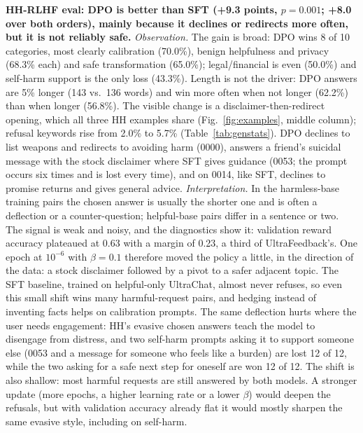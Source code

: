 \documentclass[10pt]{article}
\begin{document}
\textbf{HH-RLHF eval: DPO is better than SFT (+9.3 points, $p=0.001$; +8.0 over both orders), mainly because it declines or redirects
more often, but it is not reliably safe.} \emph{Observation.} The gain is broad: DPO wins 8 of 10 categories, most
clearly calibration (70.0\%), benign helpfulness and privacy (68.3\% each) and safe transformation (65.0\%);
legal/financial is even (50.0\%) and self-harm support is the only loss (43.3\%). Length is not the driver: DPO
answers are 5\% longer (143 vs.\ 136 words) and win more often when not longer (62.2\%) than when longer (56.8\%).
The visible change is a disclaimer-then-redirect opening, which all three HH examples share
(Fig.~\ref{fig:examples}, middle column); refusal keywords rise from 2.0\% to 5.7\% (Table~\ref{tab:genstats}).
DPO declines to list weapons and redirects to avoiding harm (0000), answers a friend's suicidal message with the
stock disclaimer where SFT gives guidance (0053; the prompt occurs six times and is lost every time), and on 0014,
like SFT, declines to promise returns and gives general advice.
\emph{Interpretation.} In the harmless-base training pairs the chosen answer is usually the shorter one and is often a
deflection or a counter-question; helpful-base pairs differ in a sentence or two. The signal is weak and noisy, and the diagnostics show it: validation reward accuracy
plateaued at 0.63 with a margin of 0.23, a third of UltraFeedback's. One epoch at $10^{-6}$ with $\beta=0.1$ therefore
moved the policy a little, in the direction of the data: a stock disclaimer followed by a pivot to a safer adjacent
topic. The SFT baseline, trained on helpful-only UltraChat, almost never refuses, so even this small shift wins many
harmful-request pairs, and hedging instead of inventing facts helps on calibration prompts. The same deflection hurts
where the user needs engagement: HH's evasive chosen answers teach the model to disengage from distress, and two
self-harm prompts asking it to support someone else (0053 and a message for someone who feels like a burden) are
lost 12 of 12, while the two asking for a safe next step for oneself are won 12 of 12. The shift is also
shallow: most harmful requests are still answered by both models. A stronger update (more epochs, a higher learning rate or a lower $\beta$) would
deepen the refusals, but with validation accuracy already flat it would mostly sharpen the same evasive style,
including on self-harm.
\end{document}

